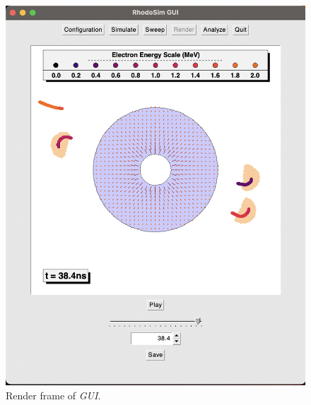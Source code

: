 \documentclass[a4paper,oneside,12pt]{report}
\numberwithin{equation}{chapter}
\begin{document}
\begin{figure}
    \centering
    \includegraphics[width=\linewidth]{./figures/rhodoSim/GUI_render_frame_2.png}
    \caption{Render frame of \textit{GUI}.}
    \label{fig:gui_render_2}
\end{figure}
\end{document}
